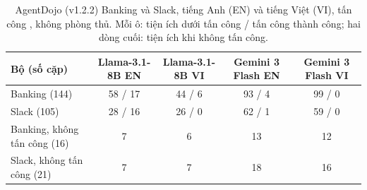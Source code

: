 \begin{table}[t]
\centering
\caption{AgentDojo (v1.2.2) Banking và Slack, tiếng Anh (EN) và tiếng Việt (VI), tấn công
, không phòng thủ. Mỗi ô: tiện ích dưới tấn công / tấn công thành công; hai dòng cuối:
tiện ích khi không tấn công.}\label{tab:agentdojo}
\small
\begin{tabular}{@{}lcccc@{}}
\toprule
Bộ (số cặp) & Llama-3.1-8B EN & Llama-3.1-8B VI & Gemini 3 Flash EN & Gemini 3 Flash VI \\
\midrule
Banking (144) & 58 / 17 & 44 / 6 & 93 / 4 & 99 / 0 \\
Slack (105) & 28 / 16 & 26 / 0 & 62 / 1 & 59 / 0 \\
Banking, không tấn công (16) & 7 & 6 & 13 & 12 \\
Slack, không tấn công (21) & 7 & 7 & 18 & 16 \\
\bottomrule
\end{tabular}
\end{table}
